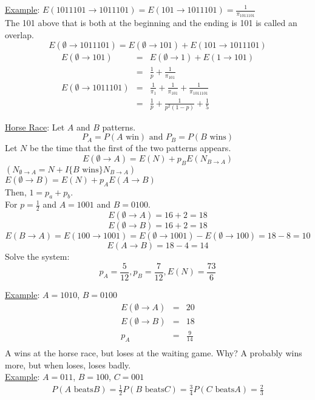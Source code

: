     \noindent\underline{Example}: $E(1011101 \to 1011101) = E(101 \to 1011101) = 
    \frac{1}{\pi_{1011101}}$\\
    The 101 above that is both at the beginning and the ending is 101 is called
    an overlap.\\
    $$
      E( \emptyset \to 1011101 ) = E( \emptyset \to 101) + E(101 \to 1011101)
    $$
    \begin{eqnarray*}
      E(\emptyset \to 101) & = & E(\emptyset \to 1) + E(1 \to 101)\\
        & = & \frac{1}{p} + \frac{1}{\pi_{101}}\\
      E( \emptyset \to 1011101 )  & = & \frac{1}{\pi_1} + \frac{1}{\pi_101} + 
        \frac{1}{\pi_{1011101}}\\
      & = & \frac{1}{p} + \frac{1}{p^2(1 - p)} + \frac{1}{5}
    \end{eqnarray*}

    \noindent\underline{Horse Race}: Let $A$ and $B$ patterns.\\
    $$
      P_A = P(A\text{ win}) \text{ and } P_B = P(B \text{ wins})
    $$
    Let $N$ be the time that the first of the two patterns appears.\\

    $$
      E(\emptyset \to A) = E(N) + p_B E(N_{B \to A})
    $$
    $(N_{\emptyset \to A} = N + I\{B \text{ wins}\} N_{B \to A})$\\
    $E( \emptyset \to B) = E(N) + p_A E(A \to B)$\\
    Then, $1 = p_a + p_b$.\\
    For $p = \frac{1}{2}$ and $A = 1001$ and $B = 0100$.\\
    $$
      E(\emptyset \to A) = 16 + 2 = 18
    $$
    $$
      E(\emptyset \to B) = 16 + 2 = 18
    $$
    $$
      E(B \to A) = E(100 \to 1001) = E(\emptyset \to 1001) - 
      E(\emptyset \to 100) = 18 - 8 = 10
    $$
    $$
      E(A \to B) = 18 - 4 = 14
    $$
    Solve the system:
    $$
      p_A = \frac{5}{12}, p_B = \frac{7}{12}, E(N) = \frac{73}{6}
    $$

    \noindent\underline{Example}:
      $A = 1010$, $B = 0100$\\
      \begin{eqnarray*}
        E(\emptyset \to A) & = & 20\\
        E(\emptyset \to B) & = & 18\\
        p_A & = & \frac{9}{14}\\
      \end{eqnarray*}
      A wins at the horse race, but loses at the waiting game. Why?
      A probably wins more, but when loses, loses badly.\\

    \noindent\underline{Example}:
      $A = 011$, $B = 100$, $C = 001$\\
      \begin{eqnarray*}
        P(A \text{ beats} B) = \frac{1}{2}
        P(B \text{ beats} C) = \frac{3}{4}
        P(C \text{ beats} A) = \frac{2}{3}
      \end{eqnarray*}
